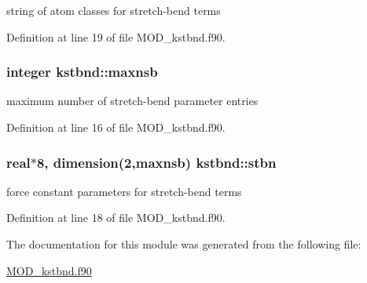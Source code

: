 string of atom classes for stretch-\/bend terms 



Definition at line 19 of file M\-O\-D\-\_\-kstbnd.\-f90.

\hypertarget{classkstbnd_aa6a230189cca6d972b96f2ddb2e6d54c}{
\subsubsection[{maxnsb}]{\setlength{\rightskip}{0pt plus 5cm}integer kstbnd\-::maxnsb}}\label{classkstbnd_aa6a230189cca6d972b96f2ddb2e6d54c}


maximum number of stretch-\/bend parameter entries 



Definition at line 16 of file M\-O\-D\-\_\-kstbnd.\-f90.

\hypertarget{classkstbnd_a9712960c45399ccb7f0a8079f369d21a}{
\subsubsection[{stbn}]{\setlength{\rightskip}{0pt plus 5cm}real$\ast$8, dimension(2,{\bf maxnsb}) kstbnd\-::stbn}}\label{classkstbnd_a9712960c45399ccb7f0a8079f369d21a}


force constant parameters for stretch-\/bend terms 



Definition at line 18 of file M\-O\-D\-\_\-kstbnd.\-f90.



The documentation for this module was generated from the following file\-:\begin{DoxyCompactItemize}
\item 
\hyperlink{MOD__kstbnd_8f90}{M\-O\-D\-\_\-kstbnd.\-f90}\end{DoxyCompactItemize}

